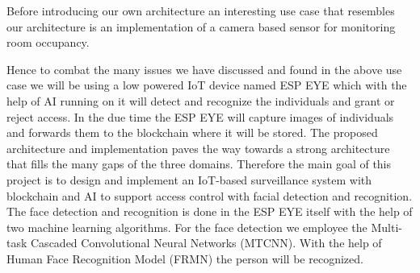 Before introducing our own architecture an interesting use case that resembles  our architecture is an implementation of a camera based sensor for monitoring room occupancy. 

Hence to combat the many issues we have discussed and found in the above use case we will be using a low powered IoT device named ESP EYE which with the help of AI running on it will detect and recognize the individuals and grant or reject access. In the due time the ESP EYE will capture images of individuals and forwards them to the blockchain where it will be stored. The proposed architecture and implementation paves the way towards a strong architecture that fills the many gaps of the three domains. Therefore the main goal of this project is to design and implement an IoT-based surveillance system with blockchain and AI to support access control with facial detection and recognition. 
The face detection and recognition is done in the ESP EYE itself with the help of two machine learning algorithms. For the face detection we employee the Multi-task Cascaded Convolutional Neural Networks (MTCNN). With the help of Human Face Recognition Model (FRMN) the person will be recognized. 







 
 



